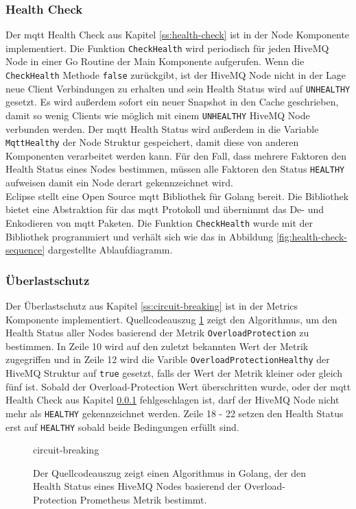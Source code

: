 \subsubsection{Health Check} \label{si:health-check}
Der \ac{mqtt} Health Check aus Kapitel \ref{ss:health-check} ist in der Node Komponente implementiert. Die Funktion \verb|CheckHealth| wird periodisch für jeden HiveMQ Node in einer Go Routine der Main Komponente aufgerufen. Wenn die \verb|CheckHealth| Methode \verb|false| zurückgibt, ist der HiveMQ Node nicht in der Lage neue Client Verbindungen zu erhalten und sein Health Status wird auf \verb|UNHEALTHY| gesetzt. Es wird au{\ss}erdem sofort ein neuer Snapshot in den Cache geschrieben, damit so wenig Clients wie möglich mit einem \verb|UNHEALTHY| HiveMQ Node verbunden werden. Der \ac{mqtt} Health Status wird au{\ss}erdem in die Variable \verb|MqttHealthy| der Node Struktur gespeichert, damit diese von anderen Komponenten verarbeitet werden kann. Für den Fall, dass mehrere Faktoren den Health Status eines Nodes bestimmen, müssen alle Faktoren den Status \verb|HEALTHY| aufweisen damit ein Node derart gekennzeichnet wird.
\\
Eclipse stellt eine Open Source \ac{mqtt} Bibliothek für Golang bereit.
\cite{EclipsePahoMqtt2021}
Die Bibliothek bietet eine Abstraktion für das \ac{mqtt} Protokoll und übernimmt das De- und Enkodieren von \ac{mqtt} Paketen. Die Funktion \verb|CheckHealth| wurde mit der Bibliothek programmiert und verhält sich wie das in Abbildung \ref{fig:health-check-sequence} dargestellte Ablaufdiagramm.

\subsubsection{Überlastschutz}
Der Überlastschutz aus Kapitel \ref{ss:circuit-breaking} ist in der Metrics Komponente implementiert. Quellcodeauszug \ref{code:circuit-breaking} zeigt den Algorithmus, um den Health Status aller Nodes basierend der Metrik \verb|OverloadProtection| zu bestimmen. In Zeile 10 wird auf den zuletzt bekannten Wert der Metrik zugegriffen und in Zeile 12 wird die Varible \verb|OverloadProtectionHealthy| der HiveMQ Struktur auf \verb|true| gesetzt, falls der Wert der Metrik kleiner oder gleich fünf ist.
Sobald der Overload-Protection Wert überschritten wurde, oder der \ac{mqtt} Health Check aus Kapitel \ref{si:health-check} fehlgeschlagen ist, darf der HiveMQ Node nicht mehr als \verb|HEALTHY| gekennzeichnet werden. Zeile 18 - 22 setzen den Health Status erst auf \verb|HEALTHY| sobald beide Bedingungen erfüllt sind.
\begin{figure}
    {circuit-breaking}
    \caption{Der Quellcodeauszug zeigt einen Algorithmus in Golang, der den Health Status eines HiveMQ Nodes basierend der Overload-Protection Prometheus Metrik bestimmt.}
    \label{code:circuit-breaking}
\end{figure}
\newpage


